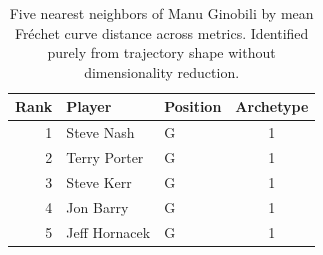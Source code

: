 \begin{table}[htbp]
  \centering\small
  \begin{tabular}{rllc}
    \toprule
    Rank & Player & Position & Archetype \\
    \midrule
    1 & Steve Nash & G & 1 \\
    2 & Terry Porter & G & 1 \\
    3 & Steve Kerr & G & 1 \\
    4 & Jon Barry & G & 1 \\
    5 & Jeff Hornacek & G & 1 \\
    \bottomrule
  \end{tabular}
  \caption{Five nearest neighbors of Manu Ginobili by mean Fr\'{e}chet curve distance across metrics. Identified purely from trajectory shape without dimensionality reduction.}
  \label{tab:Manu_Ginobili_frechet_curve_neighbors}
\end{table}

